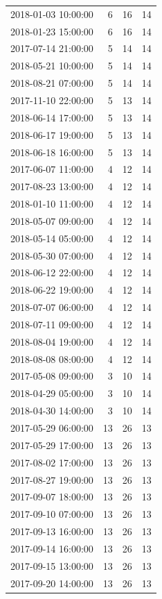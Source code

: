 \begin{tabular}{lrrr}
2018-01-03 10:00:00 & 6 & 16 & 14 \\
2018-01-23 15:00:00 & 6 & 16 & 14 \\
2017-07-14 21:00:00 & 5 & 14 & 14 \\
2018-05-21 10:00:00 & 5 & 14 & 14 \\
2018-08-21 07:00:00 & 5 & 14 & 14 \\
2017-11-10 22:00:00 & 5 & 13 & 14 \\
2018-06-14 17:00:00 & 5 & 13 & 14 \\
2018-06-17 19:00:00 & 5 & 13 & 14 \\
2018-06-18 16:00:00 & 5 & 13 & 14 \\
2017-06-07 11:00:00 & 4 & 12 & 14 \\
2017-08-23 13:00:00 & 4 & 12 & 14 \\
2018-01-10 11:00:00 & 4 & 12 & 14 \\
2018-05-07 09:00:00 & 4 & 12 & 14 \\
2018-05-14 05:00:00 & 4 & 12 & 14 \\
2018-05-30 07:00:00 & 4 & 12 & 14 \\
2018-06-12 22:00:00 & 4 & 12 & 14 \\
2018-06-22 19:00:00 & 4 & 12 & 14 \\
2018-07-07 06:00:00 & 4 & 12 & 14 \\
2018-07-11 09:00:00 & 4 & 12 & 14 \\
2018-08-04 19:00:00 & 4 & 12 & 14 \\
2018-08-08 08:00:00 & 4 & 12 & 14 \\
2017-05-08 09:00:00 & 3 & 10 & 14 \\
2018-04-29 05:00:00 & 3 & 10 & 14 \\
2018-04-30 14:00:00 & 3 & 10 & 14 \\
2017-05-29 06:00:00 & 13 & 26 & 13 \\
2017-05-29 17:00:00 & 13 & 26 & 13 \\
2017-08-02 17:00:00 & 13 & 26 & 13 \\
2017-08-27 19:00:00 & 13 & 26 & 13 \\
2017-09-07 18:00:00 & 13 & 26 & 13 \\
2017-09-10 07:00:00 & 13 & 26 & 13 \\
2017-09-13 16:00:00 & 13 & 26 & 13 \\
2017-09-14 16:00:00 & 13 & 26 & 13 \\
2017-09-15 13:00:00 & 13 & 26 & 13 \\
2017-09-20 14:00:00 & 13 & 26 & 13 \\

\end{tabular}
